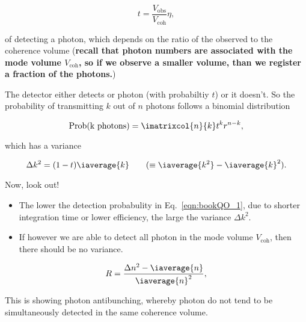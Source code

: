   \begin{equation}\label{eqn:bookQO_1}
    t = \frac{V_\text{obs}}{V_\text{coh}}\eta,
  \end{equation}

  \noindent of  detecting a photon, which  depends on the ratio  of the
  observed to the coherence  volume (\textbf{recall that photon numbers
    are associated  with the  mode volume  $ V_\text{coh}  $, so  if we
    observe  a smaller  volume,  than  we register  a  fraction of  the
    photons.})

  The detector either detects or photon  (with probabiltiy $ t $) or it
  doesn't.  So  the probability  of transmitting  $ k  $ out  of $  n $
  photons follows a binomial distribution

  \begin{equation}
    \text{Prob(k photons)} = \imatrixcol{n}{k}t^{k}r^{n-k},
  \end{equation}

  \noindent which has a variance

  \begin{equation}
    \Delta k^2 = (1-t)\iaverage{k} \qquad (\equiv \iaverage{k^2} - \iaverage{k}^2).
  \end{equation}

  \noindent Now, look out!
  \begin{itemize}
  \item     The     lower      the     detection     probabulity     in
    Eq.~\eqref{eqn:bookQO_1}, due to shorter  integration time or lower
    efficiency, the large the variance $ \Delta k^2 $.
  \item If however we are able to  detect all photon in the mode volume
    $ V_\text{coh} $, then there should be no variance.
  \end{itemize}

\begin{framed}\noindent

 \begin{equation}
   R = \frac{\Delta n^2 - \iaverage{n}}{\iaverage{n}^2},
 \end{equation}
 \noindent  {}

 This is showing photon antibunching, whereby  photon do not tend to be
 simultaneously detected in the same coherence volume.

\end{framed}


